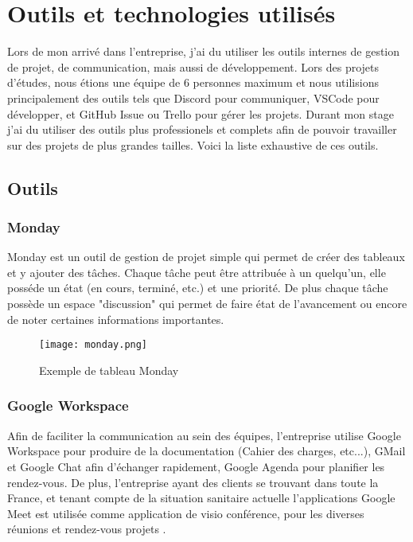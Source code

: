 \section{Outils et technologies utilisés}


Lors de mon arrivé dans l'entreprise, j'ai du utiliser les outils internes de gestion de projet, de communication, mais aussi de développement. Lors des projets d'études, nous étions une équipe de 6 personnes maximum et nous utilisions principalement des outils tels que Discord pour communiquer, VSCode pour développer, et GitHub Issue ou Trello pour gérer les projets. Durant mon stage j'ai du utiliser des outils plus professionels et complets afin de pouvoir travailler sur des projets de plus grandes tailles. Voici la liste exhaustive de ces outils. 
\subsection{Outils}

\subsubsection{Monday}

Monday est un outil de gestion de projet simple qui permet de créer des tableaux et y ajouter des tâches.
Chaque tâche peut être attribuée à un quelqu'un, elle posséde un état (en cours, terminé, etc.) et une priorité.
De plus chaque tâche possède un espace "discussion" qui permet de faire état de l'avancement ou encore de noter certaines informations importantes. 

\begin{figure}[htbp]
    \center
    \texttt{[image: monday.png]}
    \caption{Exemple de tableau Monday}
\end{figure}

\subsubsection{Google Workspace}
Afin de faciliter la communication au sein des équipes, l'entreprise utilise Google Workspace pour produire de la documentation (Cahier des charges, etc...), GMail et Google Chat afin d'échanger rapidement, Google Agenda pour planifier les rendez-vous.
De plus, l'entreprise ayant des clients se trouvant dans toute la France, et tenant compte de la situation sanitaire actuelle l'applications Google Meet est utilisée comme application de visio conférence, pour les diverses réunions et rendez-vous projets . 

